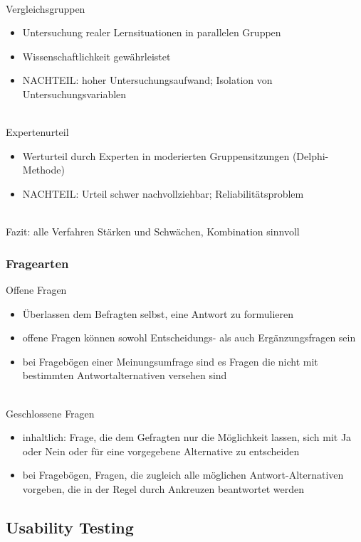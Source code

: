 \documentclass[a4paper]{article}
\begin{document}
~\\
Vergleichsgruppen
\begin{itemize}
	\item Untersuchung realer Lernsituationen in parallelen Gruppen
	\item Wissenschaftlichkeit gewährleistet
	\item NACHTEIL: hoher Untersuchungsaufwand; Isolation von Untersuchungsvariablen
\end{itemize}
~\\
Expertenurteil
\begin{itemize}
	\item Werturteil durch Experten in moderierten Gruppensitzungen (Delphi-Methode)
	\item NACHTEIL: Urteil schwer nachvollziehbar; Reliabilitätsproblem
\end{itemize}
~\\
Fazit: alle Verfahren Stärken und Schwächen, Kombination sinnvoll
~\\
\subsubsection{Fragearten}
Offene Fragen
\begin{itemize}
	\item Überlassen dem Befragten selbst, eine Antwort zu formulieren
	\item offene Fragen können sowohl Entscheidungs- als auch Ergänzungsfragen sein
	\item bei Fragebögen einer Meinungsumfrage sind es Fragen die nicht mit bestimmten Antwortalternativen versehen sind
\end{itemize}
~\\
Geschlossene Fragen
\begin{itemize}
	\item inhaltlich: Frage, die dem Gefragten nur die Möglichkeit lassen, sich mit Ja oder Nein oder für eine vorgegebene Alternative zu entscheiden
	\item bei Fragebögen, Fragen, die zugleich alle möglichen Antwort-Alternativen vorgeben, die in der Regel durch Ankreuzen beantwortet werden
\end{itemize}

\subsection{Usability Testing}
\end{document}
